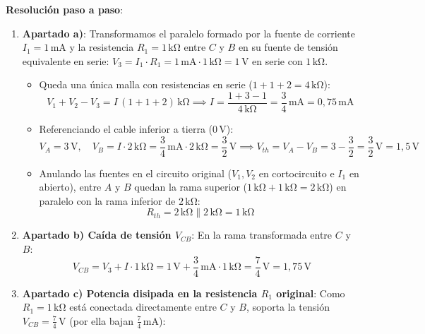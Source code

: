 \begin{ejercicio}
\textbf{Resolución paso a paso}:
\begin{enumerate}
    \item \textbf{Apartado a)}: Transformamos el paralelo formado por la fuente de corriente $I_1 = 1\,\si{\milli\ampere}$ y la resistencia $R_1 = 1\,\si{\kilo\ohm}$ entre $C$ y $B$ en su fuente de tensión equivalente en serie: $V_3 = I_1 \cdot R_1 = 1\,\si{\milli\ampere}\cdot 1\,\si{\kilo\ohm} = 1\,\si{\volt}$ en serie con $1\,\si{\kilo\ohm}$.
    \begin{itemize}
        \item Queda una única malla con resistencias en serie ($1 + 1 + 2 = 4\,\si{\kilo\ohm}$):
        \begin{equation*}
            V_1 + V_2 - V_3 = I\,(1 + 1 + 2)\,\si{\kilo\ohm} \implies I = \frac{1 + 3 - 1}{4\,\si{\kilo\ohm}} = \frac{3}{4}\,\si{\milli\ampere} = 0{,}75\,\si{\milli\ampere}
        \end{equation*}
        \item Referenciando el cable inferior a tierra ($0\,\si{\volt}$):
        \begin{equation*}
            V_A = 3\,\si{\volt}, \quad V_B = I\cdot 2\,\si{\kilo\ohm} = \frac{3}{4}\,\si{\milli\ampere}\cdot 2\,\si{\kilo\ohm} = \frac{3}{2}\,\si{\volt} \implies \boxed{V_{th} = V_A - V_B = 3 - \frac{3}{2} = \frac{3}{2}\,\si{\volt} = 1{,}5\,\si{\volt}}
        \end{equation*}
        \item Anulando las fuentes en el circuito original ($V_1, V_2$ en cortocircuito e $I_1$ en abierto), entre $A$ y $B$ quedan la rama superior ($1\,\si{\kilo\ohm} + 1\,\si{\kilo\ohm} = 2\,\si{\kilo\ohm}$) en paralelo con la rama inferior de $2\,\si{\kilo\ohm}$:
        \begin{equation*}
            \boxed{R_{th} = 2\,\si{\kilo\ohm} \parallel 2\,\si{\kilo\ohm} = 1\,\si{\kilo\ohm}}
        \end{equation*}
    \end{itemize}
    \item \textbf{Apartado b) Caída de tensión $V_{CB}$}: En la rama transformada entre $C$ y $B$:
    \begin{equation*}
        \boxed{V_{CB} = V_3 + I\cdot 1\,\si{\kilo\ohm} = 1\,\si{\volt} + \frac{3}{4}\,\si{\milli\ampere}\cdot 1\,\si{\kilo\ohm} = \frac{7}{4}\,\si{\volt} = 1{,}75\,\si{\volt}}
    \end{equation*}
    \item \textbf{Apartado c) Potencia disipada en la resistencia $R_1$ original}: Como $R_1 = 1\,\si{\kilo\ohm}$ está conectada directamente entre $C$ y $B$, soporta la tensión $V_{CB} = \frac{7}{4}\,\si{\volt}$ (por ella bajan $\frac{7}{4}\,\si{\milli\ampere}$):

\end{enumerate}
\end{ejercicio}
